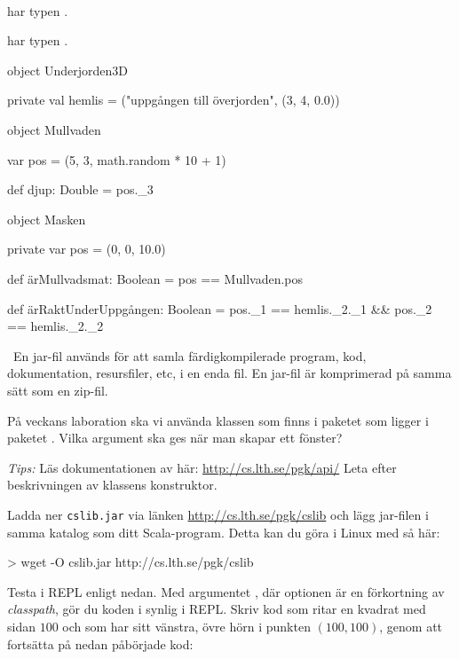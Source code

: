 \SOLUTION

\TaskSolved \what~

\SubtaskSolved {} har typen .

\SubtaskSolved {} har typen .


\SubtaskSolved
\begin{Code}
object Underjorden3D {
  private val hemlis = ("uppgången till överjorden", (3, 4, 0.0))

  object Mullvaden {
    var pos = (5, 3, math.random * 10 + 1)

    def djup: Double  = pos._3
  }

  object Masken {
    private var pos = (0, 0, 10.0)

    def ärMullvadsmat: Boolean = pos == Mullvaden.pos

    def ärRaktUnderUppgången: Boolean =
      pos._1 == hemlis._2._1 && pos._2 == hemlis._2._2
  }
}
\end{Code}

\QUESTEND



\QUESTBEGIN

\Task \what~En jar-fil används för att samla färdigkompilerade program, kod, dokumentation, resursfiler, etc, i en enda fil. En jar-fil är komprimerad på samma sätt som en zip-fil.

\Subtask På veckans laboration ska vi använda klassen  som finns i paketet  som ligger i paketet . Vilka argument ska ges när man skapar ett fönster?

\emph{Tips:}  Läs dokumentationen av  här:  \url{http://cs.lth.se/pgk/api/}
 Leta efter beskrivningen av klassens konstruktor.

\Subtask Ladda ner \texttt{cslib.jar} via länken \url{http://cs.lth.se/pgk/cslib} och lägg jar-filen i samma katalog som ditt Scala-program. Detta kan du göra i Linux med  så här:

\begin{REPLnonum}
> wget -O cslib.jar http://cs.lth.se/pgk/cslib
\end{REPLnonum}

\Subtask Testa  i REPL enligt nedan. Med argumentet , där optionen  är en förkortning av \emph{classpath}, gör du koden i  synlig i REPL.  Skriv kod som ritar en kvadrat med sidan $100$ och som har sitt vänstra, övre hörn i punkten $(100,100)$, genom att fortsätta på nedan påbörjade kod:

